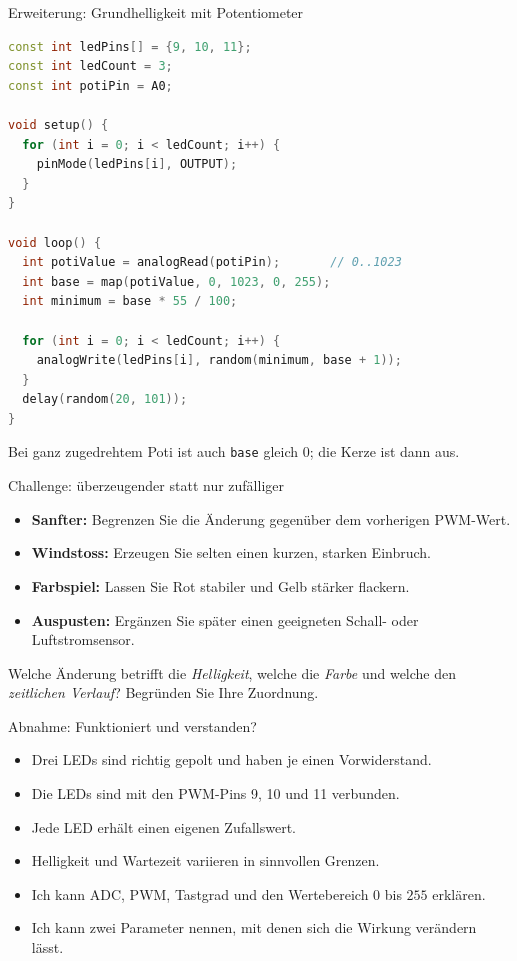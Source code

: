 \begin{frame}[fragile]{Erweiterung: Grundhelligkeit mit Potentiometer}
\begin{lstlisting}[language=C++,basicstyle=\ttfamily\scriptsize]
const int ledPins[] = {9, 10, 11};
const int ledCount = 3;
const int potiPin = A0;

void setup() {
  for (int i = 0; i < ledCount; i++) {
    pinMode(ledPins[i], OUTPUT);
  }
}

void loop() {
  int potiValue = analogRead(potiPin);       // 0..1023
  int base = map(potiValue, 0, 1023, 0, 255);
  int minimum = base * 55 / 100;

  for (int i = 0; i < ledCount; i++) {
    analogWrite(ledPins[i], random(minimum, base + 1));
  }
  delay(random(20, 101));
}
\end{lstlisting}
	Bei ganz zugedrehtem Poti ist auch \lstinline|base| gleich $0$; die Kerze ist dann aus.
\end{frame}

\begin{frame}{Challenge: überzeugender statt nur zufälliger}
	\begin{itemize}[<+->]
		\item \textbf{Sanfter:} Begrenzen Sie die Änderung gegenüber dem vorherigen PWM-Wert.
		\item \textbf{Windstoss:} Erzeugen Sie selten einen kurzen, starken Einbruch.
		\item \textbf{Farbspiel:} Lassen Sie Rot stabiler und Gelb stärker flackern.
		\item \textbf{Auspusten:} Ergänzen Sie später einen geeigneten Schall- oder Luftstromsensor.
	\end{itemize}
	\pause
	\begin{myexercise}
		Welche Änderung betrifft die \emph{Helligkeit}, welche die \emph{Farbe} und welche den
		\emph{zeitlichen Verlauf}? Begründen Sie Ihre Zuordnung.
	\end{myexercise}
\end{frame}

\begin{frame}{Abnahme: Funktioniert und verstanden?}
	\begin{itemize}
		\item[$\square$] Drei LEDs sind richtig gepolt und haben je einen Vorwiderstand.
		\item[$\square$] Die LEDs sind mit den PWM-Pins 9, 10 und 11 verbunden.
		\item[$\square$] Jede LED erhält einen eigenen Zufallswert.
		\item[$\square$] Helligkeit und Wartezeit variieren in sinnvollen Grenzen.
		\item[$\square$] Ich kann ADC, PWM, Tastgrad und den Wertebereich $0$ bis $255$ erklären.
		\item[$\square$] Ich kann zwei Parameter nennen, mit denen sich die Wirkung verändern lässt.
	\end{itemize}
\end{frame}

